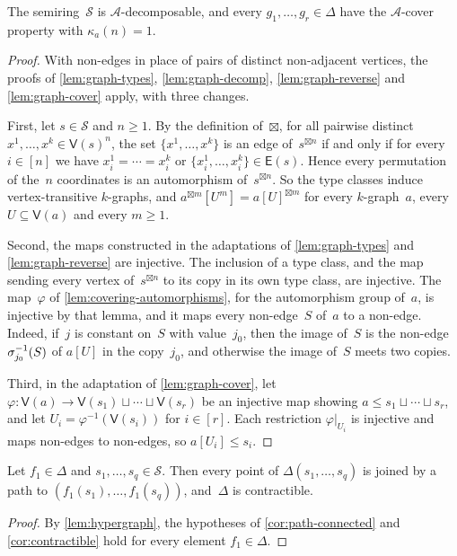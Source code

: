 \documentclass[11pt,letterpaper]{article}
\begin{document}
\begin{lemma}\label{lem:hypergraph}
The semiring~$\mathcal{S}$ is $\mathcal{A}$-decomposable, and every $g_1, \ldots, g_r \in \Delta$ have the $\mathcal{A}$-cover property with $\kappa_a(n) = 1$.
\end{lemma}
\begin{proof}
With non-edges in place of pairs of distinct non-adjacent vertices, the proofs of \cref{lem:graph-types}, \cref{lem:graph-decomp}, \cref{lem:graph-reverse} and \cref{lem:graph-cover} apply, with three changes.

First, let $s \in \mathcal{S}$ and $n \geq 1$. By the definition of~$\boxtimes$, for all pairwise distinct $x^1, \ldots, x^k \in \mathsf{V}(s)^n$, the set $\{x^1, \ldots, x^k\}$ is an edge of~$s^{\boxtimes n}$ if and only if for every $i \in [n]$ we have $x^1_i = \cdots = x^k_i$ or $\{x^1_i, \ldots, x^k_i\} \in \mathsf{E}(s)$. Hence every permutation of the~$n$ coordinates is an automorphism of~$s^{\boxtimes n}$. So the type classes induce vertex-transitive $k$-graphs, and $a^{\boxtimes m}[U^m] = a[U]^{\boxtimes m}$ for every $k$-graph~$a$, every $U \subseteq \mathsf{V}(a)$ and every $m \geq 1$.

Second, the maps constructed in the adaptations of \cref{lem:graph-types} and \cref{lem:graph-reverse} are injective. The inclusion of a type class, and the map sending every vertex of~$s^{\boxtimes n}$ to its copy in its own type class, are injective. The map~$\varphi$ of \cref{lem:covering-automorphisms}, for the automorphism group of~$a$, is injective by that lemma, and it maps every non-edge~$S$ of~$a$ to a non-edge. Indeed, if~$j$ is constant on~$S$ with value~$j_0$, then the image of~$S$ is the non-edge~$\sigma_{j_0}^{\smash[t]{-1}}(S)$ of $a[U]$ in the copy~$j_0$, and otherwise the image of~$S$ meets two copies.

Third, in the adaptation of \cref{lem:graph-cover}, let $\varphi : \mathsf{V}(a) \to \mathsf{V}(s_1) \sqcup \cdots \sqcup \mathsf{V}(s_r)$ be an injective map showing $a \leq s_1 \sqcup \cdots \sqcup s_r$, and let $U_i = \varphi^{-1}(\mathsf{V}(s_i))$ for $i \in [r]$. Each restriction $\varphi|_{U_i}$ is injective and maps non-edges to non-edges, so $a[U_i] \leq s_i$.
\end{proof}

\begin{corollary}\label{cor:hypergraph-paths}
Let $f_1 \in \Delta$ and $s_1, \ldots, s_q \in \mathcal{S}$. Then every point of $\Delta(s_1, \ldots, s_q)$ is joined by a path to $(f_1(s_1), \ldots, f_1(s_q))$, and~$\Delta$ is contractible.
\end{corollary}
\begin{proof}
By \cref{lem:hypergraph}, the hypotheses of \cref{cor:path-connected} and \cref{cor:contractible} hold for every element $f_1 \in \Delta$.
\end{proof}
\end{document}
